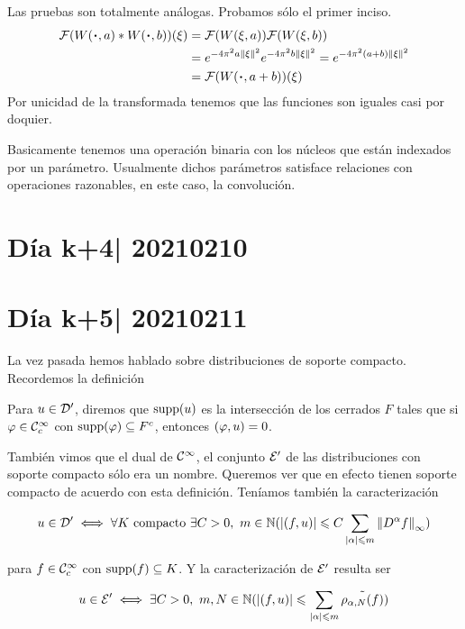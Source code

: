 \documentclass[12pt]{memoir}
\begin{document}
\begin{ptcbp}
  Las pruebas son totalmente análogas. Probamos sólo el primer inciso.
  \begin{align*}
    \cF(W(\.,a)\ast W(\.,b))(\xi)&=\cF(W(\xi,a))\cF(W(\xi,b))\\
    &=e^{-4\pi^2a\nm{\xi}^2}e^{-4\pi^2b\nm{\xi}^2}=e^{-4\pi^2(a+b)\nm{\xi}^2}\\
    &=\cF(W(\.,a+b))(\xi)
  \end{align*}
  Por unicidad de la transformada tenemos que las funciones son iguales casi por doquier. 
\end{ptcbp}

Basicamente tenemos una operación binaria con los núcleos que están indexados por un parámetro. Usualmente dichos parámetros satisface relaciones con operaciones razonables, en este caso, la convolución.


\section{Día k+4| 20210210}
\section{Día k+5| 20210211}

La vez pasada hemos hablado sobre distribuciones de soporte compacto. Recordemos la definición 

\begin{Def}
  Para $u\in\mathcal{D}'$, diremos que $\operatorname{supp}(u)$ es la intersección de los cerrados $F$ tales que si $\varphi\in\mathcal{C}^\infty_c$ con $\operatorname{supp}(\varphi)\subseteq F^c$, entonces $(\varphi,u)=0$. %
\end{Def}

También vimos que el dual de $\mathcal{C}^\infty$, el conjunto $\mathcal{E}'$ de las distribuciones con soporte compacto sólo era un nombre. Queremos ver que en efecto tienen soporte compacto de acuerdo con esta definición. Teníamos también la caracterización

$$u\in\cD'\iff \forall K\ \text{compacto}\ \exists C>0,\ m\in\bN(|(f,u)|\leq C\sum_{|\al|\leq m}\nm{D^\al f}_\infty)$$

para $f\in\mathcal{C}^\infty_c$ con $\operatorname{supp}(f)\subseteq K$. Y la caracterización de $\mathcal{E}'$ resulta ser 

$$u\in\cE'\iff \exists C>0,\ m,N\in\bN(|(f,u)|\leq \sum_{|\al|\leq m}\tilde{\rho_{\al,N}(f)})$$
\end{document}
